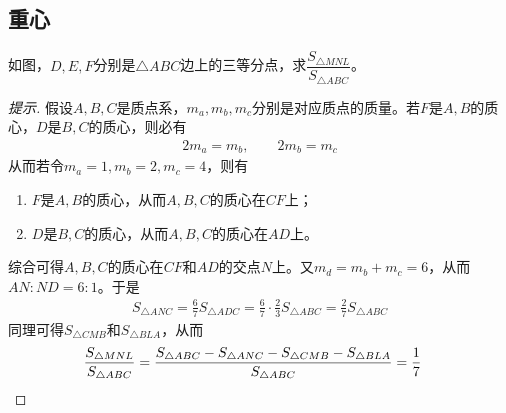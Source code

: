\subsection{重心}
\label{sec:math-physics-gravity}

\begin{example}
  如图，$D,E,F$分别是$\triangle ABC$边上的三等分点，求$\dfrac{S_{\triangle MNL}}{S_{\triangle ABC}}$。
  \begin{center}
  \end{center}
\end{example}
\begin{proof}[提示]
  假设$A,B,C$是质点系，$m_a,m_b,m_c$分别是对应质点的质量。若$F$是$A,B$的质心，$D$是$B,C$的质心，则必有
  \begin{align*}
    2m_a=m_b, \qquad 2m_b=m_c
  \end{align*}
  从而若令$m_a=1,m_b=2,m_c=4$，则有
  \begin{enumerate}
  \item $F$是$A,B$的质心，从而$A,B,C$的质心在$CF$上；
  \item $D$是$B,C$的质心，从而$A,B,C$的质心在$AD$上。
  \end{enumerate}
  综合可得$A,B,C$的质心在$CF$和$AD$的交点$N$上。又$m_d=m_b+m_c=6$，从而$AN:ND=6:1$。于是
  \begin{align*}
    S_{\triangle ANC} = \frac67 S_{\triangle ADC} = \frac67 \cdot \frac23 S_{\triangle ABC} = \frac27 S_{\triangle ABC}
  \end{align*}
  同理可得$S_{\triangle CMB}$和$S_{\triangle BLA}$，从而
  \begin{align*}
    \frac{S_{\triangle MNL}}{S_{\triangle ABC}} = \frac{S_{\triangle ABC} - S_{\triangle ANC} - S_{\triangle CMB} - S_{\triangle BLA}}{S_{\triangle ABC}} = \frac17 &\qedhere
  \end{align*}
\end{proof}

